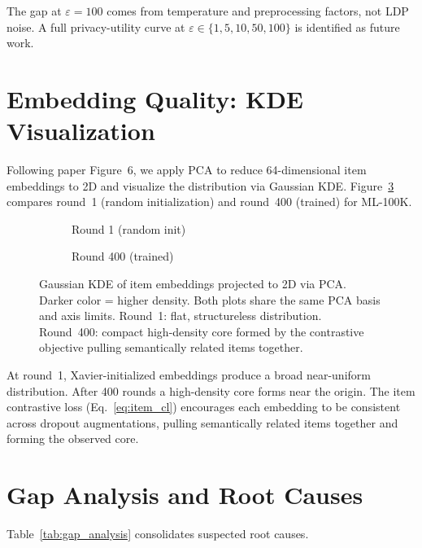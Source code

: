\documentclass[10pt,twocolumn]{article}
\begin{document}
The gap at $\varepsilon{=}100$ comes from temperature and preprocessing
factors, not LDP noise. A full privacy-utility curve at
$\varepsilon \in \{1, 5, 10, 50, 100\}$ is identified as future work.

\section{Embedding Quality: KDE Visualization}
\label{sec:kde}

Following paper Figure~6, we apply PCA to reduce 64-dimensional item
embeddings to 2D and visualize the distribution via Gaussian KDE.
Figure~\ref{fig:kde} compares round~1 (random initialization) and
round~400 (trained) for ML-100K.

\begin{figure}[H]
  \centering
  \begin{subfigure}[b]{0.48\linewidth}
    \caption{Round 1 (random init)}
    \label{fig:kde_r1}
  \end{subfigure}
  \hfill
  \begin{subfigure}[b]{0.48\linewidth}
    \caption{Round 400 (trained)}
    \label{fig:kde_r400}
  \end{subfigure}
  \caption{Gaussian KDE of item embeddings projected to 2D via PCA.
    Darker color = higher density. Both plots share the same PCA basis
    and axis limits. Round~1: flat, structureless distribution.
    Round~400: compact high-density core formed by the contrastive
    objective pulling semantically related items together.}
  \label{fig:kde}
\end{figure}

At round~1, Xavier-initialized embeddings produce a broad near-uniform
distribution. After 400 rounds a high-density core forms near the origin.
The item contrastive loss (Eq.~\ref{eq:item_cl}) encourages each
embedding to be consistent across dropout augmentations, pulling
semantically related items together and forming the observed core.

\section{Gap Analysis and Root Causes}
\label{sec:gaps}

Table~\ref{tab:gap_analysis} consolidates suspected root causes.
\end{document}
